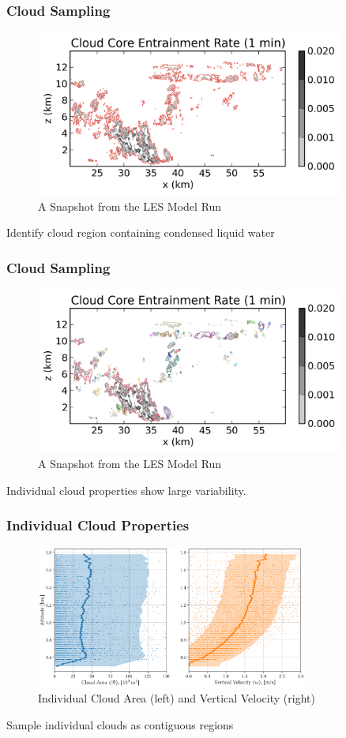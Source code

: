 \documentclass{beamer}
\begin{document}
\begin{frame}
    \frametitle{Cloud Sampling}
    \begin{figure}
        \centering
        \includegraphics[width=0.9\textwidth]{img/core.png}
        \caption{ A Snapshot from the LES Model Run }
    \end{figure}
    Identify cloud region containing condensed liquid water
\end{frame}

\begin{frame}
    \frametitle{Cloud Sampling}
    \begin{figure}
        \centering
        \includegraphics[width=0.9\textwidth]{img/cores.png}
        \caption{ A Snapshot from the LES Model Run }
    \end{figure}
    Individual cloud properties show large variability.
\end{frame}

\begin{frame}
    \frametitle{Individual Cloud Properties}
    \begin{figure}
        \centering
        \includegraphics[width=0.8\textwidth]{img/aw.png}
        \caption{ Individual Cloud Area (left) and Vertical Velocity (right) }
    \end{figure}
    Sample individual clouds as contiguous regions
\end{frame}
\end{document}
